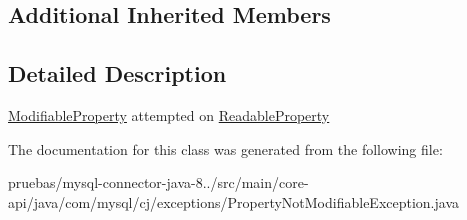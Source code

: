\subsection*{Additional Inherited Members}


\subsection{Detailed Description}
\mbox{\hyperlink{}{Modifiable\+Property}} attempted on \mbox{\hyperlink{}{Readable\+Property}} 

The documentation for this class was generated from the following file\+:\begin{DoxyCompactItemize}
\item 
pruebas/mysql-\/connector-\/java-\/8../src/main/core-\/api/java/com/mysql/cj/exceptions/Property\+Not\+Modifiable\+Exception.\+java\end{DoxyCompactItemize}
